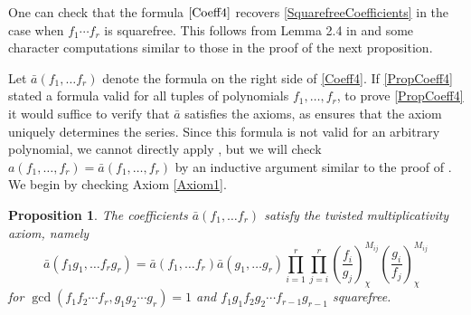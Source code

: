 \documentclass[11pt,letterpaper]{article}
\newtheorem{prop}[theorem]{Proposition}
\theoremstyle{definition}
\theoremstyle{remark}
\numberwithin{equation}{section}
\theoremstyle{dotless}
\newcommand{\res}[2]{\left(\frac{#1}{#2}\right)}
\begin{document}
One can check that the formula $\eqref{Coeff4}$ recovers \eqref{SquarefreeCoefficients} in the case when $f_1 \cdots f_r$ is squarefree. This follows from Lemma 2.4 in \cite{s-amds} and some character computations similar to those in the proof of the next proposition.

Let $\bar{a}(f_1, \ldots f_r)$ denote the formula on the right side of \eqref{Coeff4}. If \ref{PropCoeff4} stated a formula valid for all tuples of polynomials $f_1,\ldots, f_r$, to prove \ref{PropCoeff4} it would suffice to verify that $\bar{a}$ satisfies the axioms, as \cite[Theorem 1.1]{s-amds} ensures that the axiom uniquely determines the series. Since this formula is not valid for an arbitrary polynomial, we cannot directly apply \cite[Theorem 1.1]{s-amds}, but we will check $a(f_1,\ldots, f_r) = \bar{a}(f_1,\ldots, f_r)$ by an inductive argument similar to the proof of \cite[Theorem 1.1]{s-amds}. We begin by checking Axiom \ref{Axiom1}.

\begin{prop} \label{PropTwistedMult}
The coefficients $\bar{a}(f_1, \ldots f_r)$ satisfy the twisted multiplicativity axiom, namely 
\begin{equation}\label{TwistedMult}
\bar{a}(f_1g_1, \ldots f_rg_r) = \bar{a}(f_1, \ldots f_r)\bar{a}(g_1, \ldots g_r) \prod_{i=1}^r \prod_{j=i}^r \res{f_i}{g_j}_{\chi}^{M_{ij}} \res{g_i}{f_j}_{\chi}^{M_{ij}}
\end{equation}
for $\gcd(f_1f_2\cdots f_r, g_1g_2\cdots g_r)=1$ and $f_1g_1f_2g_2 \cdots f_{r-1}g_{r-1}$ squarefree. 
\end{prop}
\end{document}
